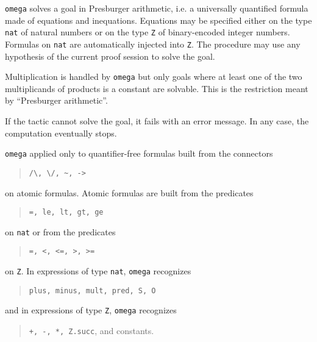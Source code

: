 \label{OmegaChapter}

\label{description}

{\tt omega} solves a goal in Presburger arithmetic, i.e. a universally
quantified formula made of equations and inequations. Equations may
be specified either on the type \verb=nat= of natural numbers or on
the type \verb=Z= of binary-encoded integer numbers. Formulas on
\verb=nat= are automatically injected into \verb=Z=.  The procedure
may use any hypothesis of the current proof session to solve the goal.

Multiplication is handled by {\tt omega} but only goals where at
least one of the two multiplicands of products is a constant are
solvable. This is the restriction meant by ``Presburger arithmetic''.

If the tactic cannot solve the goal, it fails with an error message.
In any case, the computation eventually stops.


{\tt omega} applied only to quantifier-free formulas built from the
connectors

\begin{quote}
\verb=/\, \/, ~, ->=
\end{quote}

on atomic formulas. Atomic formulas are built from the predicates

\begin{quote}
\verb!=, le, lt, gt, ge!
\end{quote}

 on \verb=nat= or from the predicates

\begin{quote}
\verb!=, <, <=, >, >=!
\end{quote}

 on \verb=Z=. In expressions of type \verb=nat=, {\tt omega} recognizes

\begin{quote}
\verb!plus, minus, mult, pred, S, O!
\end{quote}

and in expressions of type \verb=Z=, {\tt omega} recognizes

\begin{quote}
\verb!+, -, *, Z.succ!, and constants.
\end{quote}

